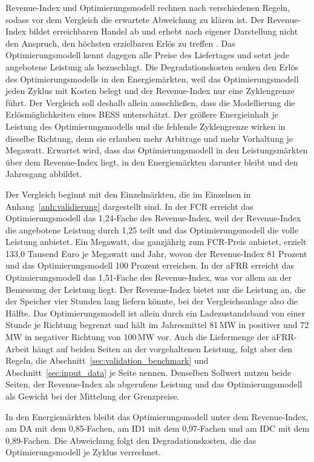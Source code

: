 Revenue-Index und Optimierungsmodell rechnen nach verschiedenen Regeln, sodass vor dem Vergleich die erwartete Abweichung zu klären ist.
Der Revenue-Index bildet erreichbaren Handel ab und erhebt nach eigener Darstellung nicht den Anspruch, den höchsten erzielbaren Erlös zu treffen \cite{isea_methodik_2026}.
Das Optimierungsmodell kennt dagegen alle Preise des Liefertages und setzt jede angebotene Leistung als bezuschlagt.
Die Degradationskosten senken den Erlös des Optimierungsmodells in den Energiemärkten, weil das Optimierungsmodell jeden Zyklus mit Kosten belegt und der Revenue-Index nur eine Zyklengrenze führt.
Der Vergleich soll deshalb allein ausschließen, dass die Modellierung die Erlösmöglichkeiten eines \ac{BESS} unterschätzt.
Der größere Energieinhalt je Leistung des Optimierungsmodells und die fehlende Zyklengrenze wirken in dieselbe Richtung, denn sie erlauben mehr Arbitrage und mehr Vorhaltung je Megawatt.
Erwartet wird, dass das Optimierungsmodell in den Leistungsmärkten über dem Revenue-Index liegt, in den Energiemärkten darunter bleibt und den Jahresgang abbildet.

Der Vergleich beginnt mit den Einzelmärkten, die im Einzelnen in Anhang~\ref{anh:validierung} dargestellt sind.
In der \ac{FCR} erreicht das Optimierungsmodell das 1,24-Fache des Revenue-Index, weil der Revenue-Index die angebotene Leistung durch 1,25 teilt und das Optimierungsmodell die volle Leistung anbietet.
Ein Megawatt, das ganzjährig zum \ac{FCR}-Preis anbietet, erzielt 133,0 Tausend Euro je Megawatt und Jahr, wovon der Revenue-Index 81 Prozent und das Optimierungsmodell 100 Prozent erreichen.
In der \ac{aFRR} erreicht das Optimierungsmodell das 1,51-Fache des Revenue-Index, was vor allem an der Bemessung der Leistung liegt.
Der Revenue-Index bietet nur die Leistung an, die der Speicher vier Stunden lang liefern könnte, bei der Vergleichsanlage also die Hälfte.
Das Optimierungsmodell ist allein durch ein Ladezustandsband von einer Stunde je Richtung begrenzt und hält im Jahresmittel 81\,\si{MW} in positiver und 72\,\si{MW} in negativer Richtung von 100\,\si{MW} vor.
Auch die Liefermenge der \ac{aFRR}-Arbeit hängt auf beiden Seiten an der vorgehaltenen Leistung, folgt aber den Regeln, die Abschnitt~\ref{sec:validation_benchmark} und Abschnitt~\ref{sec:input_data} je Seite nennen.
Denselben Sollwert nutzen beide Seiten, der Revenue-Index als abgerufene Leistung und das Optimierungsmodell als Gewicht bei der Mittelung der Grenzpreise.

In den Energiemärkten bleibt das Optimierungsmodell unter dem Revenue-Index, am \ac{DA} mit dem 0,85-Fachen, am \ac{ID1} mit dem 0,97-Fachen und am \ac{IDC} mit dem 0,89-Fachen.
Die Abweichung folgt den Degradationskosten, die das Optimierungsmodell je Zyklus verrechnet.

